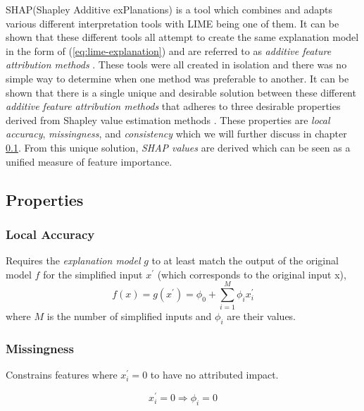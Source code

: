 SHAP(Shapley Additive exPlanations) \cite{NIPS2017_7062} is a tool which combines and adapts various different interpretation tools with LIME being one of them. It can be shown that these different tools all attempt to create the same explanation model in the form of (\ref{eq:lime-explanation}) and are referred to as \emph{additive feature attribution methods} \cite{NIPS2017_7062}. These tools were all created in isolation and there was no simple way to determine when one method was preferable to another.  It can be shown that there is a single unique and desirable solution between these different  \emph{additive feature attribution methods} that adheres to three desirable properties derived from Shapley value estimation methods \cite{articleb} \cite{article} \cite{inproceedings}. These properties are \emph{local accuracy}, \emph{missingness}, and \emph{consistency} which we will further discuss in chapter \ref{sect:shap-properties}. From this unique solution, \emph{SHAP values} \cite{NIPS2017_7062} are derived which can be seen as a unified measure of feature importance.
\subsection{Properties} \label{sect:shap-properties}

\subsubsection{Local Accuracy}
Requires the \emph{explanation model} $g$ to at least match the output of the original model $f$ for the simplified input $x^{'}$ (which corresponds to the original input x),
\begin{equation}
    f(x) = g(x^{'}) = \phi_{0} + \sum\limits_{i=1}^M \phi_i x_{i}^{'}
    \label{eq:accuracy}
\end{equation}
where $M$ is the number of simplified inputs and $\phi_{i}$ are their values.


\subsubsection{Missingness}
Constrains features where $x^{'}_{i}= 0$ to have no attributed impact. 

\begin{equation}
x^{'}_{i} = 0 \Longrightarrow \phi_{i} = 0
\label{eq:missingness}
\end{equation}


